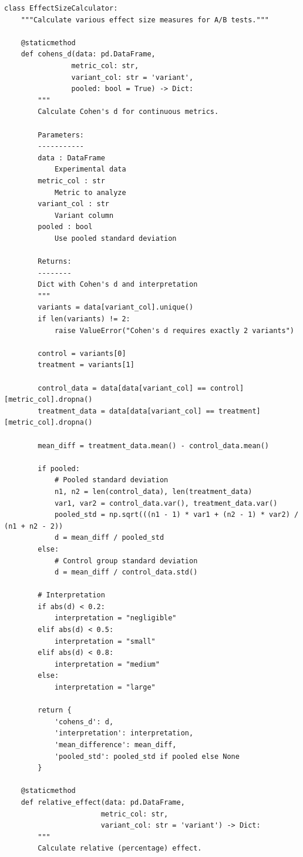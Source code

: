 \lstset{language=Python, caption=Effect Size Calculations}
\begin{lstlisting}
class EffectSizeCalculator:
    """Calculate various effect size measures for A/B tests."""

    @staticmethod
    def cohens_d(data: pd.DataFrame,
                metric_col: str,
                variant_col: str = 'variant',
                pooled: bool = True) -> Dict:
        """
        Calculate Cohen's d for continuous metrics.

        Parameters:
        -----------
        data : DataFrame
            Experimental data
        metric_col : str
            Metric to analyze
        variant_col : str
            Variant column
        pooled : bool
            Use pooled standard deviation

        Returns:
        --------
        Dict with Cohen's d and interpretation
        """
        variants = data[variant_col].unique()
        if len(variants) != 2:
            raise ValueError("Cohen's d requires exactly 2 variants")

        control = variants[0]
        treatment = variants[1]

        control_data = data[data[variant_col] == control][metric_col].dropna()
        treatment_data = data[data[variant_col] == treatment][metric_col].dropna()

        mean_diff = treatment_data.mean() - control_data.mean()

        if pooled:
            # Pooled standard deviation
            n1, n2 = len(control_data), len(treatment_data)
            var1, var2 = control_data.var(), treatment_data.var()
            pooled_std = np.sqrt(((n1 - 1) * var1 + (n2 - 1) * var2) / (n1 + n2 - 2))
            d = mean_diff / pooled_std
        else:
            # Control group standard deviation
            d = mean_diff / control_data.std()

        # Interpretation
        if abs(d) < 0.2:
            interpretation = "negligible"
        elif abs(d) < 0.5:
            interpretation = "small"
        elif abs(d) < 0.8:
            interpretation = "medium"
        else:
            interpretation = "large"

        return {
            'cohens_d': d,
            'interpretation': interpretation,
            'mean_difference': mean_diff,
            'pooled_std': pooled_std if pooled else None
        }

    @staticmethod
    def relative_effect(data: pd.DataFrame,
                       metric_col: str,
                       variant_col: str = 'variant') -> Dict:
        """
        Calculate relative (percentage) effect.


\end{lstlisting}
